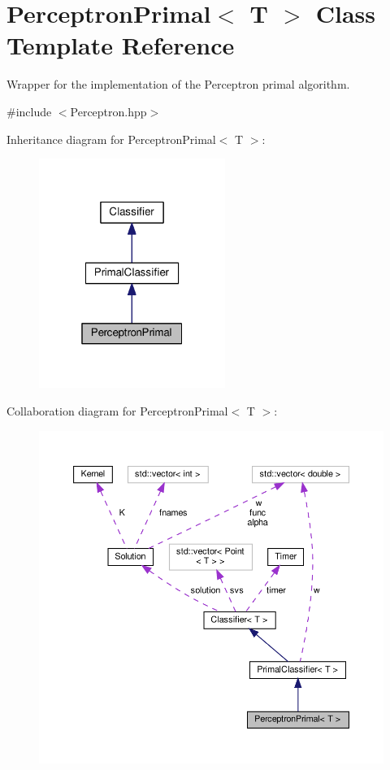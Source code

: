 \hypertarget{class_perceptron_primal}{}\section{Perceptron\+Primal$<$ T $>$ Class Template Reference}
\label{class_perceptron_primal}


Wrapper for the implementation of the Perceptron primal algorithm.  




{\ttfamily \#include $<$Perceptron.\+hpp$>$}



Inheritance diagram for Perceptron\+Primal$<$ T $>$\+:\nopagebreak
\begin{figure}[H]
\begin{center}
\leavevmode
\includegraphics[width=172pt]{class_perceptron_primal__inherit__graph}
\end{center}
\end{figure}


Collaboration diagram for Perceptron\+Primal$<$ T $>$\+:
\nopagebreak
\begin{figure}[H]
\begin{center}
\leavevmode
\includegraphics[width=350pt]{class_perceptron_primal__coll__graph}
\end{center}
\end{figure}
